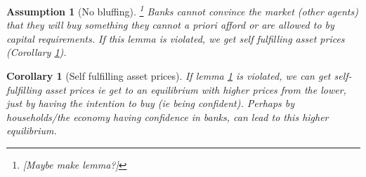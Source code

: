 \documentclass[11pt]{article}
\DeclareMathOperator{\E}{\mathbb{E}} %
\newtheorem{assumption}{Assumption}%
\newtheorem{lemma}{Lemma}%
\newtheorem{corollary}{Corollary}
\begin{document}
\begin{appendices}
\begin{assumption}[No bluffing] \label{l_noBluffing}
 \footnote{[Maybe make lemma?]} Banks cannot convince the market (other agents) that they will buy something they cannot a priori afford or are allowed to by capital requirements. If this lemma is violated, we get self fulfilling asset prices (Corollary \ref{c_selfFulfilling}).
\end{assumption}

\begin{corollary}[Self fulfilling asset prices] \label{c_selfFulfilling}
If lemma \ref{l_noBluffing} is violated, we can get self-fulfilling asset prices ie get to an equilibrium with higher prices from the lower, just by having the intention to buy (ie being confident). Perhaps by households/the economy having confidence in banks, can lead to this higher equilibrium.
\end{corollary}



\iffalse
\section{Period 0 equilibrium}
\label{proof:p0eqm}



We now turn to the initial period. Here, we see the formation of endogenous buffers, are introduced to the definition of systemic risk as well the likelihood of such an event. We also see the usefulness of macroprudential buffers. Here in general there are not analytical closed form solutions, but comparative statics are given.

\begin{lemma}
The price in period 0 is found from the equilibrium conditions.
\end{lemma}
\begin{proof}
[Move to appendix.]
The households demand is still given by
\begin{equation}
x^H_0 = \frac{\mu_0-p_0}{\gamma \sigma^2}.
\end{equation}
The intermediaries demand is also again found by the solution to their optimisation problem. Such that
\begin{equation}
x^{I}_1 = \underset{x^{I}_1}{\arg} J = \arg \max_{x^I}\left[\E_0[W^I_2] - \gamma/2\sigma^2\right].
\end{equation}
Due to the feedback and non-linear effects in period 1, this needs to be solved numerically. In figure 11 this optimal demand is shown.
As in time 1, the price is then the value p for which $x^I+x^H = z$.
\end{proof}
\fi


\end{appendices}
\end{document}
